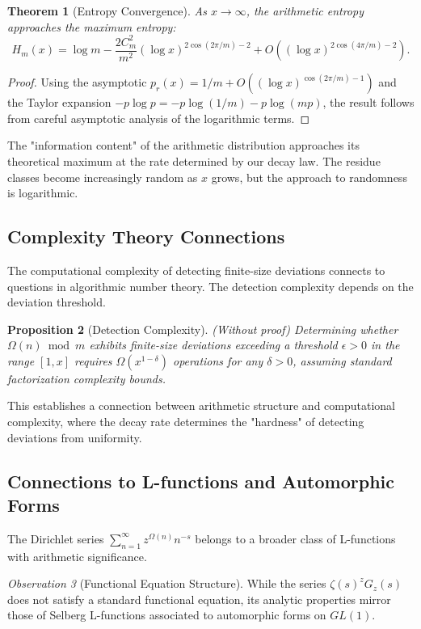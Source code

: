 \documentclass[12pt]{article}
\newtheorem{theorem}{Theorem}[section]
\newtheorem{proposition}[theorem]{Proposition}
\theoremstyle{definition}
\theoremstyle{remark}
\newtheorem{observation}[theorem]{Observation}
\begin{document}
\begin{theorem}[Entropy Convergence]
As $x \to \infty$, the arithmetic entropy approaches the maximum entropy:
\[
H_m(x) = \log m - \frac{2C_m^2}{m^2}(\log x)^{2\cos(2\pi/m) - 2} + O\left((\log x)^{2\cos(4\pi/m) - 2}\right).
\]
\end{theorem}

\begin{proof}
Using the asymptotic $p_r(x) = 1/m + O((\log x)^{\cos(2\pi/m) - 1})$ and the Taylor expansion $-p \log p = -p \log(1/m) - p \log(mp)$, the result follows from careful asymptotic analysis of the logarithmic terms.
\end{proof}

The "information content" of the arithmetic distribution approaches its theoretical maximum at the rate determined by our decay law. The residue classes become increasingly random as $x$ grows, but the approach to randomness is logarithmic.


\subsection{Complexity Theory Connections}

The computational complexity of detecting finite-size deviations connects to questions in algorithmic number theory. The detection complexity depends on the deviation threshold.

\begin{proposition}[Detection Complexity]
(Without proof) Determining whether $\Omega(n) \bmod m$ exhibits finite-size deviations exceeding a threshold $\epsilon > 0$ in the range $[1, x]$ requires $\Omega(x^{1-\delta})$ operations for any $\delta > 0$, assuming standard factorization complexity bounds.
\end{proposition}

This establishes a connection between arithmetic structure and computational complexity, where the decay rate determines the "hardness" of detecting deviations from uniformity.

\subsection{Connections to L-functions and Automorphic Forms}

The Dirichlet series $\sum_{n=1}^\infty z^{\Omega(n)} n^{-s}$ belongs to a broader class of L-functions with arithmetic significance.

\begin{observation}[Functional Equation Structure]
While the series $\zeta(s)^z G_z(s)$ does not satisfy a standard functional equation, its analytic properties mirror those of Selberg L-functions associated to automorphic forms on $GL(1)$.
\end{observation}
\end{document}
